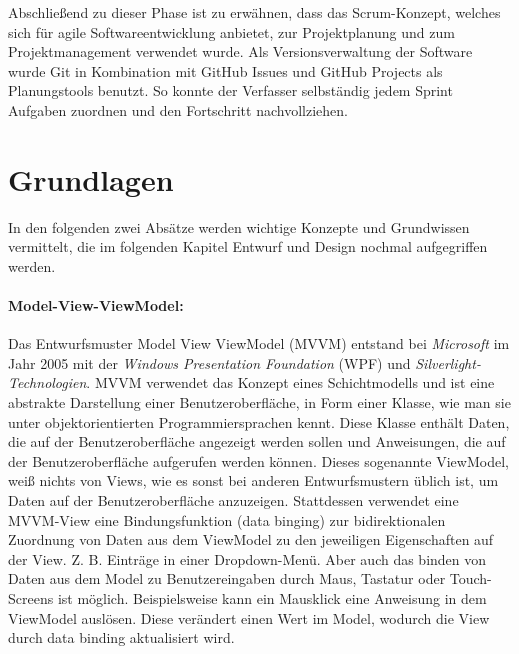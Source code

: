 \documentclass[nomenclature, oneside, 150]{HSMW-Thesis}
\begin{document}
		Abschließend zu dieser Phase ist zu erwähnen, dass das Scrum-Konzept, welches sich für agile Softwareentwicklung anbietet, zur Projektplanung und zum Projektmanagement verwendet wurde. Als Versionsverwaltung der Software wurde Git in Kombination mit GitHub Issues und GitHub Projects als Planungstools benutzt. So konnte der Verfasser selbständig jedem Sprint Aufgaben zuordnen und den Fortschritt nachvollziehen.

	\section{Grundlagen}
			In den folgenden zwei Absätze werden wichtige Konzepte und Grundwissen vermittelt, die im folgenden Kapitel Entwurf und Design nochmal aufgegriffen werden.

		\paragraph{Model-View-ViewModel:}
			Das Entwurfsmuster Model View ViewModel (MVVM) entstand bei \textit{Microsoft} im Jahr 2005 mit der \textit{Windows Presentation Foundation} (WPF) und \textit{Silverlight-Technologien}. MVVM verwendet das Konzept eines Schichtmodells und ist eine abstrakte Darstellung einer Benutzeroberfläche, in Form einer Klasse, wie man sie unter objektorientierten Programmiersprachen kennt. Diese Klasse enthält Daten, die auf der Benutzeroberfläche angezeigt werden sollen und Anweisungen, die auf der Benutzeroberfläche aufgerufen werden können. Dieses sogenannte ViewModel, weiß nichts von Views, wie es sonst bei anderen Entwurfsmustern üblich ist, um Daten auf der Benutzeroberfläche anzuzeigen. Stattdessen verwendet eine MVVM-View eine Bindungsfunktion (data binging) zur bidirektionalen Zuordnung von Daten aus dem ViewModel zu den jeweiligen Eigenschaften auf der View. Z. B. Einträge in einer Dropdown-Menü. Aber auch das binden von Daten aus dem Model zu Benutzereingaben durch Maus, Tastatur oder Touch-Screens ist möglich. Beispielsweise kann ein Mausklick eine Anweisung in dem ViewModel auslösen. Diese verändert einen Wert im Model, wodurch die View durch data binding aktualisiert wird. \cite{freeman_pro_2017} \cite{bragge_model-view-controller_2013}
\end{document}
